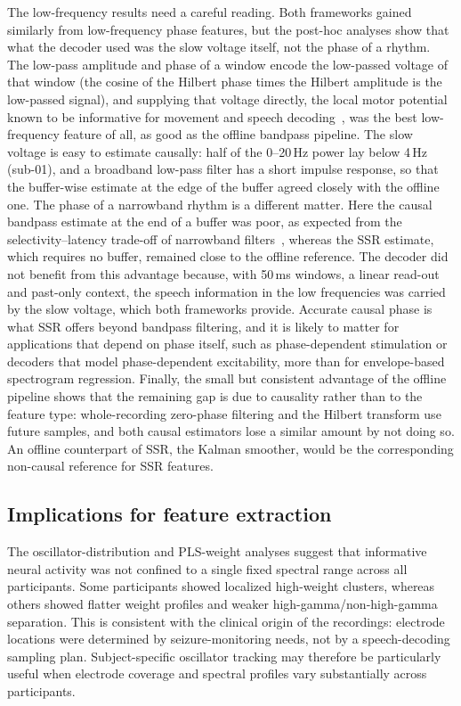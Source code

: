 \documentclass{iopjournal}
\begin{document}
The low-frequency results need a careful reading. Both frameworks gained similarly from low-frequency phase features, but the post-hoc analyses show that what the decoder used was the slow voltage itself, not the phase of a rhythm. The low-pass amplitude and phase of a window encode the low-passed voltage of that window (the cosine of the Hilbert phase times the Hilbert amplitude is the low-passed signal), and supplying that voltage directly, the local motor potential known to be informative for movement and speech decoding~\cite{Schalk2007,Proix2022}, was the best low-frequency feature of all, as good as the offline bandpass pipeline. The slow voltage is easy to estimate causally: half of the 0--20\,Hz power lay below 4\,Hz (sub-01), and a broadband low-pass filter has a short impulse response, so that the buffer-wise estimate at the edge of the buffer agreed closely with the offline one. The phase of a narrowband rhythm is a different matter. Here the causal bandpass estimate at the end of a buffer was poor, as expected from the selectivity--latency trade-off of narrowband filters~\cite{Zrenner2020,McIntosh2020}, whereas the SSR estimate, which requires no buffer, remained close to the offline reference. The decoder did not benefit from this advantage because, with 50\,ms windows, a linear read-out and past-only context, the speech information in the low frequencies was carried by the slow voltage, which both frameworks provide. Accurate causal phase is what SSR offers beyond bandpass filtering, and it is likely to matter for applications that depend on phase itself, such as phase-dependent stimulation or decoders that model phase-dependent excitability, more than for envelope-based spectrogram regression. Finally, the small but consistent advantage of the offline pipeline shows that the remaining gap is due to causality rather than to the feature type: whole-recording zero-phase filtering and the Hilbert transform use future samples, and both causal estimators lose a similar amount by not doing so. An offline counterpart of SSR, the Kalman smoother, would be the corresponding non-causal reference for SSR features.

\subsection{Implications for feature extraction}

The oscillator-distribution and PLS-weight analyses suggest that informative neural activity was not confined to a single fixed spectral range across all participants. Some participants showed localized high-weight clusters, whereas others showed flatter weight profiles and weaker high-gamma/non-high-gamma separation. This is consistent with the clinical origin of the recordings: electrode locations were determined by seizure-monitoring needs, not by a speech-decoding sampling plan. Subject-specific oscillator tracking may therefore be particularly useful when electrode coverage and spectral profiles vary substantially across participants.
\end{document}
